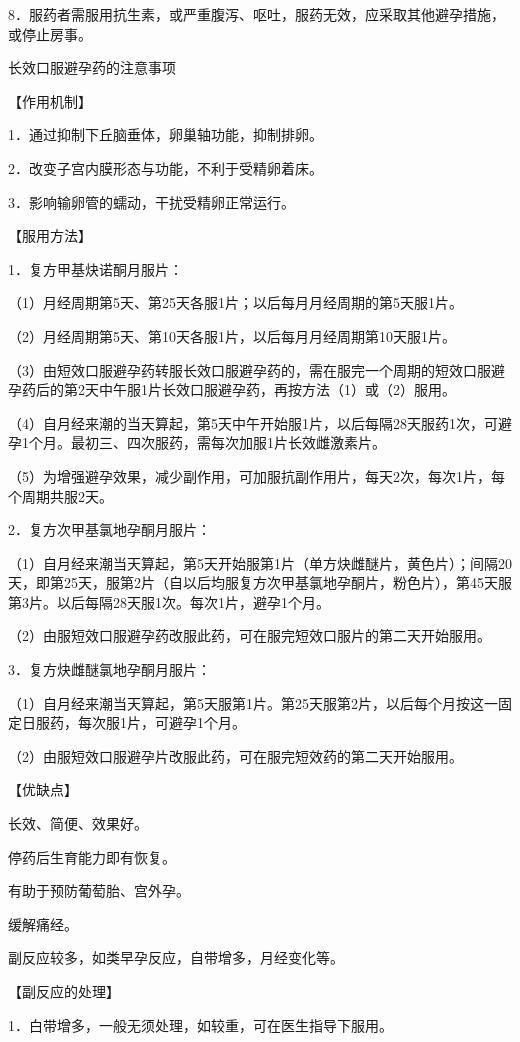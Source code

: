\documentclass[12pt,UTF8]{ctexbook}
\begin{document}
8．服药者需服用抗生素，或严重腹泻、呕吐，服药无效，应采取其他避孕措施，或停止房事。





长效口服避孕药的注意事项


【作用机制】

1．通过抑制下丘脑垂体，卵巢轴功能，抑制排卵。

2．改变子宫内膜形态与功能，不利于受精卵着床。

3．影响输卵管的蠕动，干扰受精卵正常运行。

【服用方法】

1．复方甲基炔诺酮月服片：

（1）月经周期第5天、第25天各服1片；以后每月月经周期的第5天服1片。

（2）月经周期第5天、第10天各服1片，以后每月月经周期第10天服1片。

（3）由短效口服避孕药转服长效口服避孕药的，需在服完一个周期的短效口服避孕药后的第2天中午服1片长效口服避孕药，再按方法（1）或（2）服用。

（4）自月经来潮的当天算起，第5天中午开始服1片，以后每隔28天服药1次，可避孕1个月。最初三、四次服药，需每次加服1片长效雌激素片。

（5）为增强避孕效果，减少副作用，可加服抗副作用片，每天2次，每次1片，每个周期共服2天。

2．复方次甲基氯地孕酮月服片：

（1）自月经来潮当天算起，第5天开始服第1片（单方炔雌醚片，黄色片）；间隔20天，即第25天，服第2片（自以后均服复方次甲基氯地孕酮片，粉色片），第45天服第3片。以后每隔28天服1次。每次1片，避孕1个月。

（2）由服短效口服避孕药改服此药，可在服完短效口服片的第二天开始服用。

3．复方炔雌醚氯地孕酮月服片：

（1）自月经来潮当天算起，第5天服第1片。第25天服第2片，以后每个月按这一固定日服药，每次服1片，可避孕1个月。

（2）由服短效口服避孕片改服此药，可在服完短效药的第二天开始服用。

【优缺点】

长效、简便、效果好。

停药后生育能力即有恢复。

有助于预防葡萄胎、宫外孕。

缓解痛经。

副反应较多，如类早孕反应，自带增多，月经变化等。

【副反应的处理】

1．白带增多，一般无须处理，如较重，可在医生指导下服用。
\end{document}
